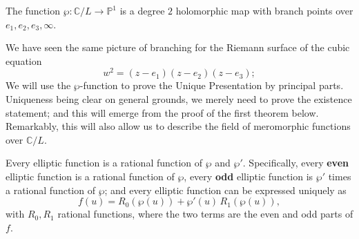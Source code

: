\documentclass[12pt]{article}
\begin{document}
\begin{proposition}
The function $\wp : \mathbb{C}/L \to \mathbb{P}^1$ is a degree $2$ holomorphic map with branch points over 
$e_1, e_2, e_3, \infty$.
\end{proposition}

We have seen the same picture of branching 
for the Riemann surface of the cubic equation
\[
    w^2 = (z - e_1)(z - e_2)(z - e_3);
\]
We will use the $\wp$-function to prove the Unique Presentation by principal parts.
Uniqueness being clear on general grounds, we merely need to prove the existence statement;
and this will emerge from the proof of the first theorem below. 
Remarkably, this will also allow us to describe the field of meromorphic functions over $\mathbb{C}/L$.

\begin{theorem}
Every elliptic function is a rational function of $\wp$ and $\wp'$. 
Specifically, every \textbf{even} elliptic function is a rational function of $\wp$, 
every \textbf{odd} elliptic function is $\wp'$ times a rational function of $\wp$;
and every elliptic function can be expressed uniquely as
\[
    f(u) = R_0(\wp(u)) + \wp'(u)\, R_1(\wp(u)),
\]
with $R_0, R_1$ rational functions, where the two terms are the even and odd parts of $f$.
\end{theorem}
\end{document}
